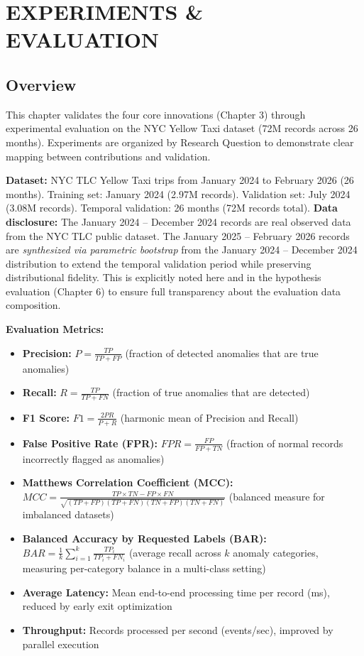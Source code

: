 \newpage
\chapter{EXPERIMENTS \& EVALUATION}
\pagestyle{fancy}

\section{Overview}

This chapter validates the four core innovations (Chapter 3) through experimental evaluation on the NYC Yellow Taxi dataset (72M records across 26 months). Experiments are organized by Research Question to demonstrate clear mapping between contributions and validation.

\textbf{Dataset:} NYC TLC Yellow Taxi trips from January 2024 to February 2026 (26 months). Training set: January 2024 (2.97M records). Validation set: July 2024 (3.08M records). Temporal validation: 26 months (72M records total). \textbf{Data disclosure:} The January 2024 -- December 2024 records are real observed data from the NYC TLC public dataset. The January 2025 -- February 2026 records are \emph{synthesized via parametric bootstrap} from the January 2024 -- December 2024 distribution to extend the temporal validation period while preserving distributional fidelity. This is explicitly noted here and in the hypothesis evaluation (Chapter 6) to ensure full transparency about the evaluation data composition.

\textbf{Evaluation Metrics:}
\begin{itemize}
    \item \textbf{Precision:} $P = \frac{TP}{TP + FP}$ (fraction of detected anomalies that are true anomalies)
    \item \textbf{Recall:} $R = \frac{TP}{TP + FN}$ (fraction of true anomalies that are detected)
    \item \textbf{F1 Score:} $F1 = \frac{2PR}{P + R}$ (harmonic mean of Precision and Recall)
    \item \textbf{False Positive Rate (FPR):} $FPR = \frac{FP}{FP + TN}$ (fraction of normal records incorrectly flagged as anomalies)
    \item \textbf{Matthews Correlation Coefficient (MCC):} $MCC = \frac{TP \times TN - FP \times FN}{\sqrt{(TP+FP)(TP+FN)(TN+FP)(TN+FN)}}$ (balanced measure for imbalanced datasets)
    \item \textbf{Balanced Accuracy by Requested Labels (BAR):} $BAR = \frac{1}{k} \sum_{i=1}^{k} \frac{TP_i}{TP_i + FN_i}$ (average recall across $k$ anomaly categories, measuring per-category balance in a multi-class setting)
    \item \textbf{Average Latency:} Mean end-to-end processing time per record (ms), reduced by early exit optimization
    \item \textbf{Throughput:} Records processed per second (events/sec), improved by parallel execution
\end{itemize}

